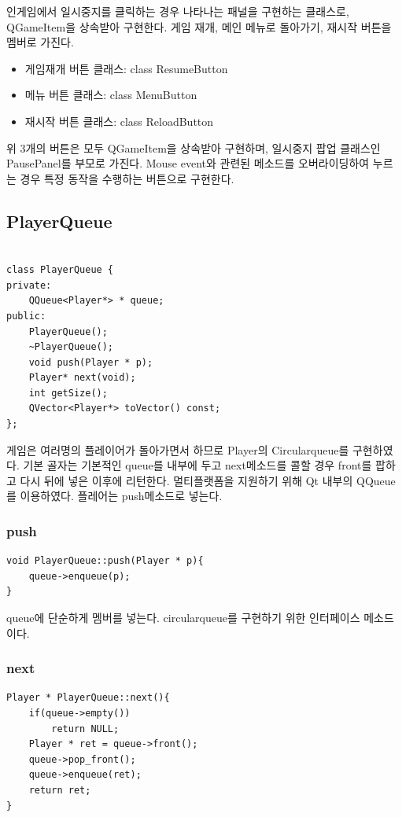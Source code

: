 \documentclass[10pt,oneside,a4paper,titlepage]{article}
\begin{document}
인게임에서 일시중지를 클릭하는 경우 나타나는 패널을 구현하는 클래스로, QGameItem을 상속받아 구현한다. 게임 재개, 메인 메뉴로 돌아가기, 재시작 버튼을 멤버로 가진다.

\begin{itemize}
\item    게임재개 버튼 클래스: class ResumeButton
\item	메뉴 버튼 클래스: class MenuButton
\item	재시작 버튼 클래스: class ReloadButton
\end{itemize}
위 3개의 버튼은 모두 QGameItem을 상속받아 구현하며, 일시중지 팝업 클래스인 PausePanel를 부모로 가진다. Mouse event와 관련된 메소드를 오버라이딩하여 누르는 경우 특정 동작을 수행하는 버튼으로 구현한다.

\subsection{PlayerQueue}
\begin{lstlisting}[frame=single,caption=
{PlayerQueue header},label=code:FD,captionpos=b,framexleftmargin=10pt]

class PlayerQueue {
private:
    QQueue<Player*> * queue;
public:
    PlayerQueue();
    ~PlayerQueue();
    void push(Player * p);
    Player* next(void);
    int getSize();
    QVector<Player*> toVector() const;
};
\end{lstlisting}

게임은 여러명의 플레이어가 돌아가면서 하므로 Player의 Circularqueue를 구현하였다. 기본 골자는 기본적인 queue를 내부에 두고 next메소드를 콜할 경우 front를 팝하고 다시 뒤에 넣은 이후에 리턴한다. 멀티플랫폼을 지원하기 위해 Qt 내부의 QQueue를 이용하였다. 플레어는 push메소드로 넣는다. 


\subsubsection{push}
\begin{lstlisting}[frame=single,caption=
{PlayerQueue push},label=code:FD,captionpos=b,framexleftmargin=10pt]
void PlayerQueue::push(Player * p){
    queue->enqueue(p);
}
\end{lstlisting}

queue에 단순하게 멤버를 넣는다. circularqueue를 구현하기 위한 인터페이스 메소드이다.

\subsubsection{next}
\begin{lstlisting}[frame=single,caption=
{PlayerQueue next},label=code:FD,captionpos=b,framexleftmargin=10pt]
Player * PlayerQueue::next(){
    if(queue->empty())
        return NULL;
    Player * ret = queue->front();
    queue->pop_front();
    queue->enqueue(ret);
    return ret;
}
\end{lstlisting}
\end{document}
